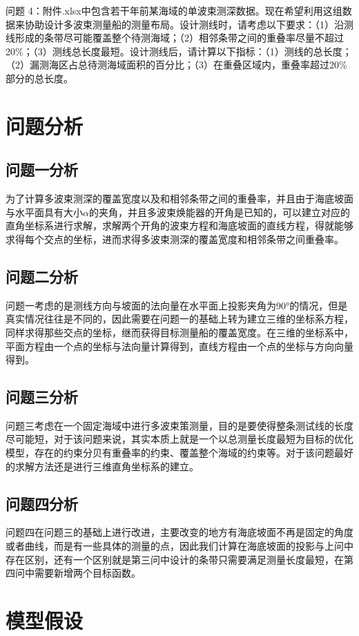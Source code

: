 \documentclass[12pt,a4paper]{article}
\begin{document}
	问题 4：附件.xlsx中包含若干年前某海域的单波束测深数据。现在希望利用这组数据来协助设计多波束测量船的测量布局。设计测线时，请考虑以下要求：（1）沿测线形成的条带尽可能覆盖整个待测海域；（2）相邻条带之间的重叠率尽量不超过20\%；（3）测线总长度最短。设计测线后，请计算以下指标：（1）测线的总长度；（2）漏测海区占总待测海域面积的百分比；（3）在重叠区域内，重叠率超过20\%部分的总长度。
	
	\section{问题分析}
	\subsection{问题一分析}
	为了计算多波束测深的覆盖宽度以及和相邻条带之间的重叠率，并且由于海底坡面与水平面具有大小$\alpha$的夹角，并且多波束焕能器的开角是已知的，可以建立对应的直角坐标系进行求解，求解两个开角的波束方程和海底坡面的直线方程，得就能够求得每个交点的坐标，进而求得多波束测深的覆盖宽度和相邻条带之间重叠率。
	
	\subsection{问题二分析}
	问题一考虑的是测线方向与坡面的法向量在水平面上投影夹角为90°的情况，但是真实情况往往是不同的，因此需要在问题一的基础上转为建立三维的坐标系方程，同样求得那些交点的坐标，继而获得目标测量船的覆盖宽度。在三维的坐标系中，平面方程由一个点的坐标与法向量计算得到，直线方程由一个点的坐标与方向向量得到。
	\subsection{问题三分析}
	问题三考虑在一个固定海域中进行多波束策测量，目的是要使得整条测试线的长度尽可能短，对于该问题来说，其实本质上就是一个以总测量长度最短为目标的优化模型，存在的约束分贝有重叠率的约束、覆盖整个海域的约束等。对于该问题最好的求解方法还是进行三维直角坐标系的建立。
	\subsection{问题四分析}
	问题四在问题三的基础上进行改进，主要改变的地方有海底坡面不再是固定的角度或者曲线，而是有一些具体的测量的点，因此我们计算在海底坡面的投影与上问中存在区别，还有一个区别就是第三问中设计的条带只需要满足测量长度最短，在第四问中需要新增两个目标函数。
	
\section{模型假设}
	
\end{document}
